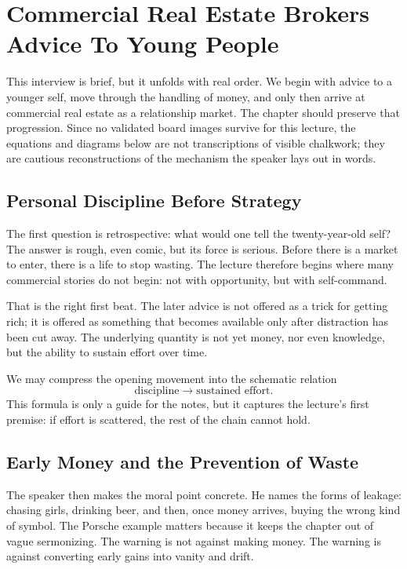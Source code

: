 \chapter{Commercial Real Estate Brokers Advice To Young People}

This interview is brief, but it unfolds with real order. We begin with advice to a younger self, move through the handling of money, and only then arrive at commercial real estate as a relationship market. The chapter should preserve that progression. Since no validated board images survive for this lecture, the equations and diagrams below are not transcriptions of visible chalkwork; they are cautious reconstructions of the mechanism the speaker lays out in words.

\section{Personal Discipline Before Strategy}

The first question is retrospective: what would one tell the twenty-year-old self? The answer is rough, even comic, but its force is serious. Before there is a market to enter, there is a life to stop wasting. The lecture therefore begins where many commercial stories do not begin: not with opportunity, but with self-command.

That is the right first beat. The later advice is not offered as a trick for getting rich; it is offered as something that becomes available only after distraction has been cut away. The underlying quantity is not yet money, nor even knowledge, but the ability to sustain effort over time.

We may compress the opening movement into the schematic relation
\begin{equation}
\text{discipline} \to \text{sustained effort}.
\end{equation}
This formula is only a guide for the notes, but it captures the lecture's first premise: if effort is scattered, the rest of the chain cannot hold.

\section{Early Money and the Prevention of Waste}

The speaker then makes the moral point concrete. He names the forms of leakage: chasing girls, drinking beer, and then, once money arrives, buying the wrong kind of symbol. The Porsche example matters because it keeps the chapter out of vague sermonizing. The warning is not against making money. The warning is against converting early gains into vanity and drift.

